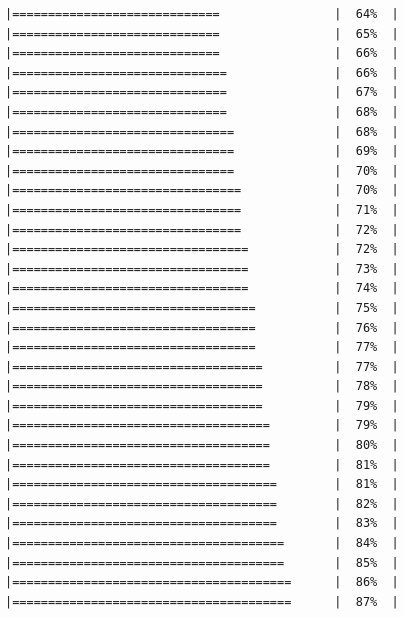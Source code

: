 \documentclass[
  krantz2]{krantz}
\begin{document}
\begin{verbatim}
|=============================                |  64%  |                                                     |=============================                |  65%  |                                                     |=============================                |  66%  |                                                     |==============================               |  66%  |                                                     |==============================               |  67%  |                                                     |==============================               |  68%  |                                                     |===============================              |  68%  |                                                     |===============================              |  69%  |                                                     |===============================              |  70%  |                                                     |================================             |  70%  |                                                     |================================             |  71%  |                                                     |================================             |  72%  |                                                     |=================================            |  72%  |                                                     |=================================            |  73%  |                                                     |=================================            |  74%  |                                                     |==================================           |  75%  |                                                     |==================================           |  76%  |                                                     |==================================           |  77%  |                                                     |===================================          |  77%  |                                                     |===================================          |  78%  |                                                     |===================================          |  79%  |                                                     |====================================         |  79%  |                                                     |====================================         |  80%  |                                                     |====================================         |  81%  |                                                     |=====================================        |  81%  |                                                     |=====================================        |  82%  |                                                     |=====================================        |  83%  |                                                     |======================================       |  84%  |                                                     |======================================       |  85%  |                                                     |=======================================      |  86%  |                                                     |=======================================      |  87%  |                        
\end{verbatim}
\end{document}
